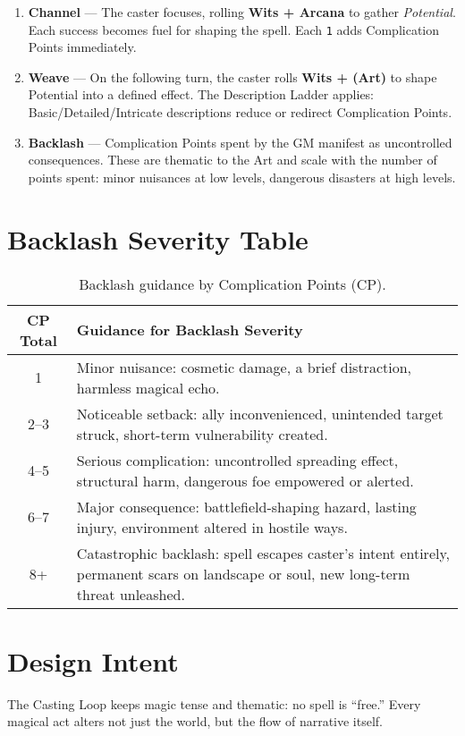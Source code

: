 \documentclass[12pt]{book}
\begin{document}
\begin{enumerate}
  \item \textbf{Channel} — The caster focuses, rolling \textbf{Wits + Arcana} to gather \emph{Potential}.  
  Each success becomes fuel for shaping the spell. Each \texttt{1} adds Complication Points immediately.  
  \item \textbf{Weave} — On the following turn, the caster rolls \textbf{Wits + (Art)} to shape Potential into a defined effect.  
  The Description Ladder applies: Basic/Detailed/Intricate descriptions reduce or redirect Complication Points.  
  \item \textbf{Backlash} — Complication Points spent by the GM manifest as uncontrolled consequences.  
  These are thematic to the Art and scale with the number of points spent: minor nuisances at low levels, dangerous disasters at high levels.  
\end{enumerate}

\section{Backlash Severity Table}

\begin{table}[h!]
\centering
\begin{tabular}{|c|p{10cm}|}
\hline
\textbf{CP Total} & \textbf{Guidance for Backlash Severity} \\
\hline
1 & Minor nuisance: cosmetic damage, a brief distraction, harmless magical echo. \\
\hline
2--3 & Noticeable setback: ally inconvenienced, unintended target struck, short-term vulnerability created. \\
\hline
4--5 & Serious complication: uncontrolled spreading effect, structural harm, dangerous foe empowered or alerted. \\
\hline
6--7 & Major consequence: battlefield-shaping hazard, lasting injury, environment altered in hostile ways. \\
\hline
8+ & Catastrophic backlash: spell escapes caster’s intent entirely, permanent scars on landscape or soul, new long-term threat unleashed. \\
\hline
\end{tabular}
\caption{Backlash guidance by Complication Points (CP).}
\end{table}

\section{Design Intent}
The Casting Loop keeps magic tense and thematic: no spell is “free.”  
Every magical act alters not just the world, but the flow of narrative itself.
\end{document}
